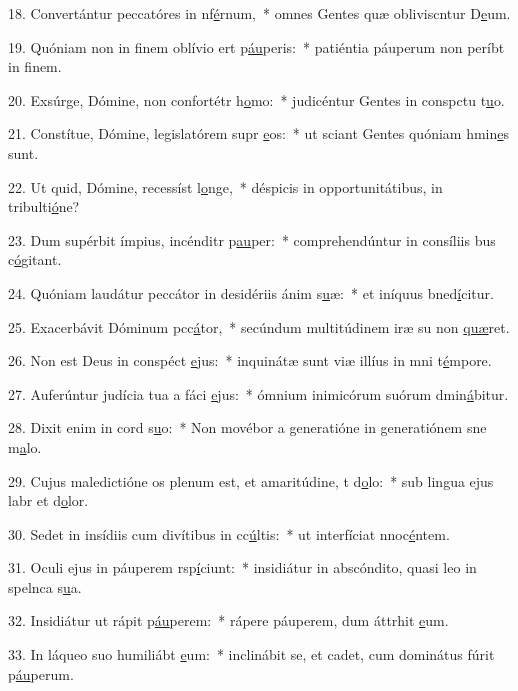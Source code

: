 18. Convertántur peccatóres in nf\uline{é}rnum,~* omnes Gentes quæ obliviscntur D\uline{e}um.\par 
19. Quóniam non in finem oblívio ert p\uline{áu}peris:~* patiéntia páuperum non períbt in f\uline{i}nem.\par 
20. Exsúrge, Dómine, non confortétr h\uline{o}mo:~* judicéntur Gentes in conspctu t\uline{u}o.\par 
21. Constítue, Dómine, legislatórem supr \uline{e}os:~* ut sciant Gentes quóniam hmin\uline{e}s sunt.\par 
22. Ut quid, Dómine, recessíst l\uline{o}nge,~* déspicis in opportunitátibus, in tribulti\uline{ó}ne?\par 
23. Dum supérbit ímpius, incénditr p\uline{au}per:~* comprehendúntur in consíliis bus c\uline{ó}gitant.\par 
24. Quóniam laudátur peccátor in desidériis ánim s\uline{u}æ:~* et iníquus bned\uline{í}citur.\par 
25. Exacerbávit Dóminum pcc\uline{á}tor,~* secúndum multitúdinem iræ su non \uline{quæ}ret.\par 
26. Non est Deus in conspéct \uline{e}jus:~* inquinátæ sunt viæ illíus in mni t\uline{é}mpore.\par 
27. Auferúntur judícia tua a fáci \uline{e}jus:~* ómnium inimicórum suórum dmin\uline{á}bitur.\par 
28. Dixit enim in cord s\uline{u}o:~* Non movébor a generatióne in generatiónem sne m\uline{a}lo.\par 
29. Cujus maledictióne os plenum est, et amaritúdine, t d\uline{o}lo:~* sub lingua ejus labr et d\uline{o}lor.\par 
30. Sedet in insídiis cum divítibus in cc\uline{ú}ltis:~* ut interfíciat nnoc\uline{é}ntem.\par 
31. Oculi ejus in páuperem rsp\uline{í}ciunt:~* insidiátur in abscóndito, quasi leo in spelnca s\uline{u}a.\par 
32. Insidiátur ut rápit p\uline{áu}perem:~* rápere páuperem, dum áttrhit \uline{e}um.\par 
33. In láqueo suo humiliábt \uline{e}um:~* inclinábit se, et cadet, cum dominátus fúrit p\uline{áu}perum.\par 
